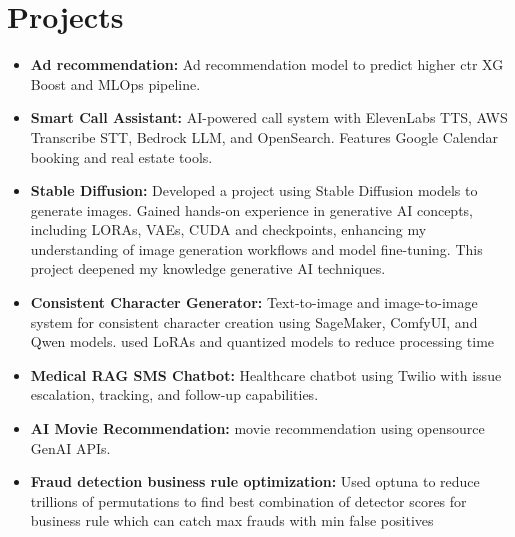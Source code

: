\section{Projects}

\begin{itemize}
  \item \textbf{Ad recommendation:} Ad recommendation model to predict higher ctr XG Boost and MLOps pipeline.
  \item \textbf{Smart Call Assistant:} AI-powered call system with ElevenLabs TTS, AWS Transcribe STT, Bedrock LLM, and OpenSearch. Features Google Calendar booking and real estate tools.
  \item \textbf{Stable Diffusion:} Developed a project using Stable Diffusion models to generate images. Gained hands-on experience in generative AI concepts, including LORAs, VAEs, CUDA and checkpoints, enhancing my understanding of image generation workflows and model fine-tuning. This project deepened my knowledge generative AI techniques.
  \item \textbf{Consistent Character Generator:} Text-to-image and image-to-image system for consistent character creation using SageMaker, ComfyUI, and Qwen models. used LoRAs and quantized models to reduce processing time
  \item \textbf{Medical RAG SMS Chatbot:} Healthcare chatbot using Twilio with issue escalation, tracking, and follow-up capabilities.
  \item \textbf{AI Movie Recommendation:} movie recommendation using opensource GenAI APIs.
  \item \textbf{Fraud detection business rule optimization:} Used optuna to reduce trillions of permutations to find best combination of detector scores for business rule which can catch max frauds with min false positives
\end{itemize}
